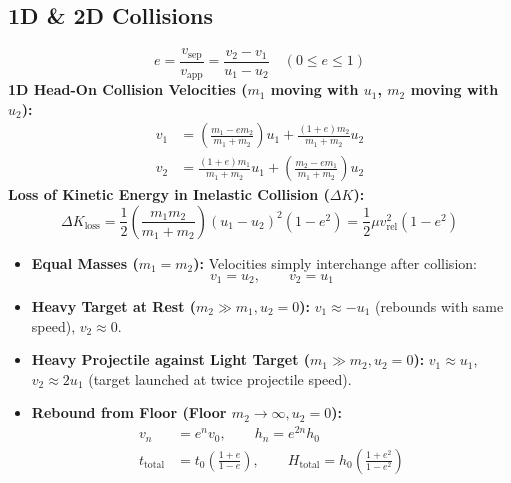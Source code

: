 \documentclass[10pt,twoside,openright]{book}
\begin{document}
\subsection{1D \& 2D Collisions}

\begin{formulabox}
\begin{equation}
  e = \frac{v_{\text{sep}}}{v_{\text{app}}} = \frac{v_2 - v_1}{u_1 - u_2} \quad (0 \le e \le 1)
\end{equation}
\textbf{1D Head-On Collision Velocities ($m_1$ moving with $u_1$, $m_2$ moving with $u_2$):}
\begin{align}
  v_1 &= \left(\frac{m_1 - e m_2}{m_1 + m_2}\right)u_1 + \frac{(1 + e)m_2}{m_1 + m_2}u_2 \\
  v_2 &= \frac{(1 + e)m_1}{m_1 + m_2}u_1 + \left(\frac{m_2 - e m_1}{m_1 + m_2}\right)u_2
\end{align}
\textbf{Loss of Kinetic Energy in Inelastic Collision ($\Delta K$):}
\begin{equation}
  \Delta K_{\text{loss}} = \frac{1}{2}\left(\frac{m_1 m_2}{m_1 + m_2}\right)(u_1 - u_2)^2 (1 - e^2) = \frac{1}{2}\mu v_{\text{rel}}^2 (1 - e^2)
\end{equation}
\end{formulabox}

\begin{usecasebox}[Special Elastic Collision Limits ($e=1$)]
\begin{itemize}
  \item \textbf{Equal Masses ($m_1 = m_2$):} Velocities simply interchange after collision:
  \begin{equation*}
    v_1 = u_2, \qquad v_2 = u_1
  \end{equation*}
  \item \textbf{Heavy Target at Rest ($m_2 \gg m_1, u_2 = 0$):} $v_1 \approx -u_1$ (rebounds with same speed), $v_2 \approx 0$.
  \item \textbf{Heavy Projectile against Light Target ($m_1 \gg m_2, u_2 = 0$):} $v_1 \approx u_1$, $v_2 \approx 2u_1$ (target launched at twice projectile speed).
  \item \textbf{Rebound from Floor (Floor $m_2 \to \infty, u_2 = 0$):}
  \begin{align*}
    v_n &= e^n v_0, \qquad h_n = e^{2n} h_0 \\
    t_{\text{total}} &= t_0\left(\frac{1 + e}{1 - e}\right), \qquad H_{\text{total}} = h_0\left(\frac{1 + e^2}{1 - e^2}\right)
  \end{align*}
\end{itemize}
\end{usecasebox}
\end{document}
